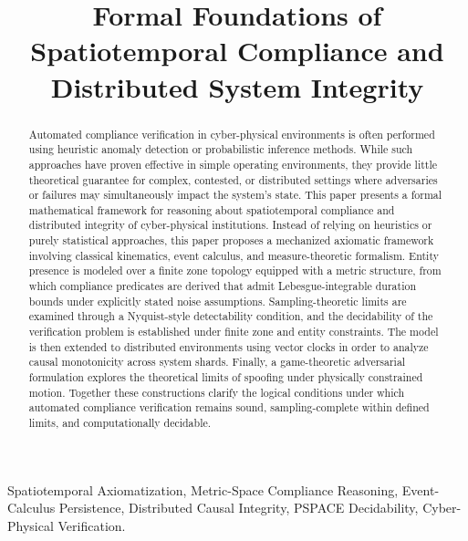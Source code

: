 \documentclass[conference]{IEEEtran}
\begin{document}
\title{Formal Foundations of Spatiotemporal Compliance and Distributed System Integrity}

\author{
}

\maketitle

\begin{abstract}
Automated compliance verification in cyber-physical environments is often performed using heuristic anomaly detection or probabilistic inference methods. While such approaches have proven effective in simple operating environments, they provide little theoretical guarantee for complex, contested, or distributed settings where adversaries or failures may simultaneously impact the system’s state. This paper presents a formal mathematical framework for reasoning about spatiotemporal compliance and distributed integrity of cyber-physical institutions. Instead of relying on heuristics or purely statistical approaches, this paper proposes a mechanized axiomatic framework involving classical kinematics, event calculus, and measure-theoretic formalism. Entity presence is modeled over a finite zone topology equipped with a metric structure, from which compliance predicates are derived that admit Lebesgue-integrable duration bounds under explicitly stated noise assumptions. Sampling-theoretic limits are examined through a Nyquist-style detectability condition, and the decidability of the verification problem is established under finite zone and entity constraints. The model is then extended to distributed environments using vector clocks in order to analyze causal monotonicity across system shards. Finally, a game-theoretic adversarial formulation explores the theoretical limits of spoofing under physically constrained motion. Together these constructions clarify the logical conditions under which automated compliance verification remains sound, sampling-complete within defined limits, and computationally decidable.
\end{abstract}

\begin{IEEEkeywords}
Spatiotemporal Axiomatization, Metric-Space Compliance Reasoning, Event-Calculus Persistence, Distributed Causal Integrity, PSPACE Decidability, Cyber-Physical Verification.
\end{IEEEkeywords}
\end{document}
